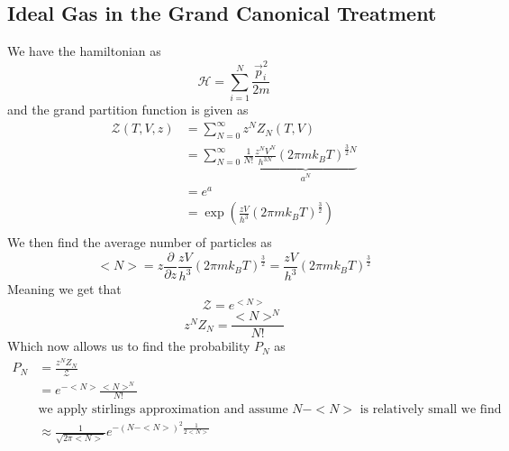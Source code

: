 \documentclass{report}
\begin{document}
\subsection{Ideal Gas in the Grand Canonical Treatment}
We have the hamiltonian as \[
  \mathcal{H} = \sum_{i=1}^{N}  \frac{\vec{p}_i^2}{2m}
\] 
and the grand partition function is given as
\begin{align*}
  \mathcal{Z}\left( T,V,z \right) &= \sum_{N = 0}^{\infty} z^N Z_N\left( T,V \right)  \\
                                  &= \sum_{N=0}^{\infty} \frac{1}{N!} \underbrace{\frac{z^N V^N}{h^{3N}} \left( 2\pi m k_B T \right) ^{\frac{3}{2}N}}_{a^N} \\
                                  &= e^a \\
                                  &= \exp\left( \frac{zV}{h^{3}} \left( 2 \pi m k_B T \right) ^{\frac{3}{2}} \right)  \\
\end{align*}
We then find the average number of particles as
\[
  <N> = z \frac{\partial }{\partial z} \frac{zV}{h^{3}} \left( 2\pi m k_B T \right)^{\frac{3}{2}} = \frac{zV}{h^{3}} \left( 2 \pi m k_B T \right)^{\frac{3}{2}}
\] 
Meaning we get that  \[
  \mathcal{Z} = e^{<N>}
\] 
\[
z^N Z_N = \frac{<N>^N}{N!}
\] 
Which now allows us to find the probability $P_N$ as 
\begin{align*}
  P_N &= \frac{z^N Z_N}{\mathcal{Z}} \\
  &=  e^{-<N>} \frac{<N>^N}{N!}\\
  &\text{we apply stirlings approximation and assume $N - <N>$ is relatively small we find} \\
  &\approx \frac{1}{\sqrt{2 \pi <N>} } e^{-\left( N-<N> \right)^2 \frac{1}{2 <N>}}\\
\end{align*}
\end{document}
